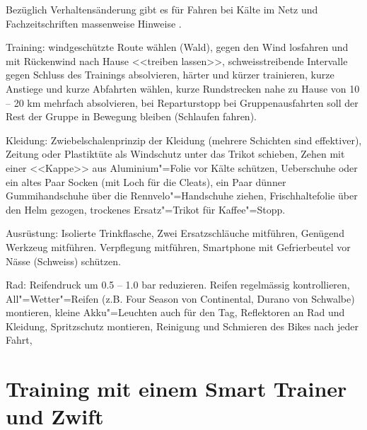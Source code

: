\documentclass[a4paper,DIV13,BCOR0cm,draft=TRUE]{scrartcl}
\newcommand{\rv}{Rennvelo}
\begin{document}
Bezüglich Verhaltensänderung gibt es für Fahren bei Kälte im Netz und Fachzeitschriften massenweise Hinweise
\cite{Thomas2009rennradbuch, gcn2011winter,gcn2015winter, gcn2015wintermistakes,beck2015frostschutz}.

\begin{itemize*}
        \item Training:
                windgeschützte Route wählen (Wald),
                gegen den Wind losfahren und mit Rückenwind nach Hause <<treiben lassen>>,
                schweisstreibende Intervalle gegen Schluss des Trainings absolvieren,
                härter und kürzer trainieren,
                kurze Anstiege und kurze Abfahrten wählen,
                kurze Rundstrecken nahe zu Hause von 10 -- 20 km mehrfach absolvieren,
                bei Reparturstopp bei Gruppenausfahrten soll der Rest der Gruppe in Bewegung bleiben (Schlaufen fahren).
        \item Kleidung:
                Zwiebelschalenprinzip der Kleidung (mehrere Schichten sind effektiver),
                Zeitung oder Plastiktüte als Windschutz unter das Trikot schieben,
                Zehen mit einer <<Kappe>> aus Aluminium"=Folie vor Kälte schützen,
                Ueberschuhe oder ein altes Paar Socken (mit Loch für die Cleats),
                ein Paar dünner Gummihandschuhe über die \rv"=Handschuhe ziehen,
                Frischhaltefolie über den Helm gezogen,
                trockenes Ersatz"=Trikot für Kaffee"=Stopp.
        \item Ausrüstung:
                Isolierte Trinkflasche,
                Zwei Ersatzschläuche mitführen,
                Genügend Werkzeug mitführen.
                Verpflegung mitführen,
                Smartphone mit Gefrierbeutel vor Nässe (Schweiss) schützen.
        \item Rad:
                Reifendruck um 0.5 -- 1.0 bar reduzieren.
                Reifen regelmässig kontrollieren,
                All"=Wetter"=Reifen (z.B. Four Season von Continental, Durano von Schwalbe) montieren,
                kleine Akku"=Leuchten auch für den Tag,
                Reflektoren an Rad und Kleidung,
                Spritzschutz montieren,
                Reinigung und Schmieren des Bikes nach jeder Fahrt,

\end{itemize*}

\section{Training mit einem Smart Trainer und Zwift}
\label{sec:training-smart-trainer}
\end{document}
